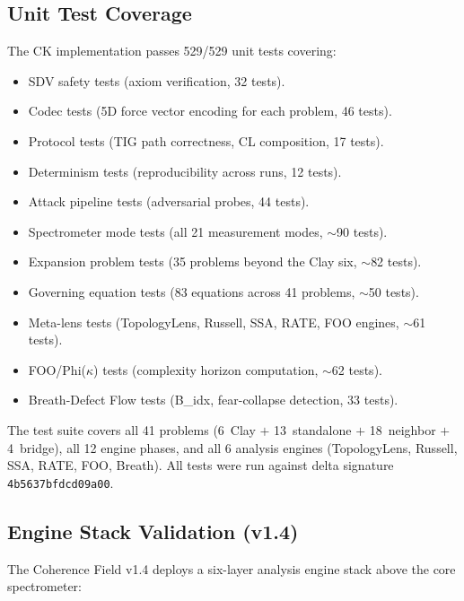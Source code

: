 \documentclass[11pt]{article}
\begin{document}
\subsection{Unit Test Coverage}
\label{subsec:tests}

The CK implementation passes 529/529 unit tests covering:
\begin{itemize}
\item SDV safety tests (axiom verification, 32 tests).
\item Codec tests (5D force vector encoding for each problem, 46 tests).
\item Protocol tests (TIG path correctness, CL composition, 17 tests).
\item Determinism tests (reproducibility across runs, 12 tests).
\item Attack pipeline tests (adversarial probes, 44 tests).
\item Spectrometer mode tests (all 21 measurement modes, $\sim$90 tests).
\item Expansion problem tests (35 problems beyond the Clay six, $\sim$82 tests).
\item Governing equation tests (83 equations across 41 problems, $\sim$50 tests).
\item Meta-lens tests (TopologyLens, Russell, SSA, RATE, FOO engines, $\sim$61 tests).
\item FOO/Phi($\kappa$) tests (complexity horizon computation, $\sim$62 tests).
\item Breath-Defect Flow tests (B\_idx, fear-collapse detection, 33 tests).
\end{itemize}

\noindent
The test suite covers all 41 problems (6~Clay $+$ 13~standalone $+$ 18~neighbor $+$ 4~bridge),
all 12 engine phases, and all 6 analysis engines (TopologyLens, Russell, SSA, RATE, FOO, Breath).
All tests were run against delta signature \texttt{4b5637bfdcd09a00}.

\subsection{Engine Stack Validation (v1.4)}
\label{subsec:engine-stack}

The Coherence Field v1.4 deploys a six-layer analysis engine stack
above the core spectrometer:
\end{document}
